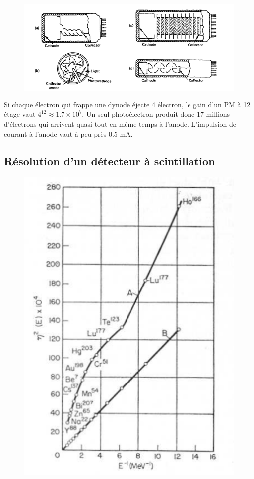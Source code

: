 	\begin{figure}
	\vspace{-5mm}
	\includegraphics[scale=0.35]{ch10/image5}
	\end{figure}
Si chaque électron qui frappe une dynode éjecte 4 électron, le gain d'un PM à 12 étage vaut
$4^12 \approx 1.7\times 10^7$. Un seul photoélectron produit donc 17 millions d'électrons qui arrivent
quasi tout en même temps à l'anode. L'impulsion de courant à l'anode vaut à peu près 0.5 mA.\\


\subsection{Résolution d'un détecteur à scintillation}%

	\begin{figure}
	\vspace{-5mm}
	\includegraphics[scale=0.35]{ch10/image6}
	\end{figure}

